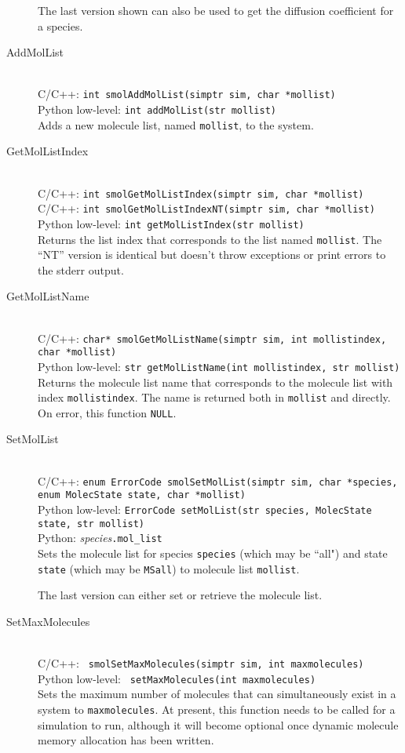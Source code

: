 \documentclass {book}
\newcommand {\ttt} {\texttt}
\begin{document}
\begin{description}
The last version shown can also be used to get the diffusion coefficient for a species.


\item[AddMolList]
\hfill \\
C/C++: \ttt{int smolAddMolList(simptr sim, char *mollist)}\\
Python low-level: \ttt{int addMolList(str mollist)}\\
Adds a new molecule list, named \ttt{mollist}, to the system.

\item[GetMolListIndex]
\hfill \\
C/C++: \ttt{int smolGetMolListIndex(simptr sim, char *mollist)}\\
C/C++: \ttt{int smolGetMolListIndexNT(simptr sim, char *mollist)}\\
Python low-level: \ttt{int getMolListIndex(str mollist)}\\
Returns the list index that corresponds to the list named \ttt{mollist}. The ``NT'' version is identical but doesn't throw exceptions or print errors to the stderr output.

\item[GetMolListName]
\hfill \\
C/C++: \ttt{char* smolGetMolListName(simptr sim, int mollistindex, char *mollist)}\\
Python low-level: \ttt{str getMolListName(int mollistindex, str mollist)}\\
Returns the molecule list name that corresponds to the molecule list with index \ttt{mollistindex}. The name is returned both in \ttt{mollist} and directly. On error, this function \ttt{NULL}.

\item[SetMolList]
\hfill \\
C/C++: \ttt{enum ErrorCode smolSetMolList(simptr sim, char *species, enum MolecState state, char *mollist)}\\
Python low-level: \ttt{ErrorCode setMolList(str species, MolecState state, str mollist)}\\
Python: \textit{species}\ttt{.mol\_list}\\
Sets the molecule list for species \ttt{species} (which may be ``all") and state \ttt{state} (which may be \ttt{MSall}) to molecule list \ttt{mollist}.

The last version can either set or retrieve the molecule list.

\item[SetMaxMolecules]
\hfill \\
C/C++: \ttt{ smolSetMaxMolecules(simptr sim, int maxmolecules)}\\
Python low-level: \ttt{ setMaxMolecules(int maxmolecules)}\\
Sets the maximum number of molecules that can simultaneously exist in a system to \ttt{maxmolecules}. At present, this function needs to be called for a simulation to run, although it will become optional once dynamic molecule memory allocation has been written.


\end{description}
\end{document}
